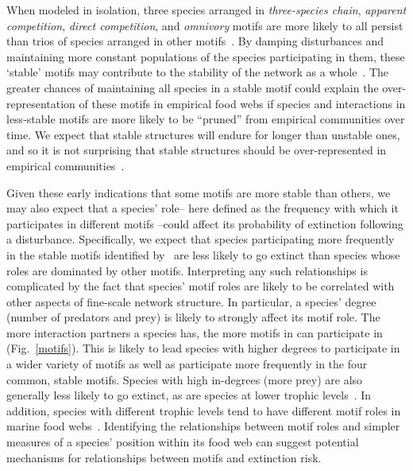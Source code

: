 \documentclass[12pt]{article}
\begin{document}
\begin{spacing}{2.0}
	When modeled in isolation, three species arranged in \emph{three-species chain}, \emph{apparent competition}, \emph{direct competition}, and \emph{omnivory} motifs are more likely to all persist than trios of species arranged in other motifs~\citep{Borrelli2015a}.
	By damping disturbances and maintaining more constant populations of the species participating in them, these `stable' motifs may contribute to the stability of the network as a whole~\citep{Borrelli2015a}. 
    The greater chances of maintaining all species in a stable motif could explain the over-representation of these motifs in empirical food webs if species and interactions in less-stable motifs are more likely to be ``pruned'' from empirical communities over time. We expect that stable structures will endure for longer than unstable ones, and so it is not surprising that stable structures should be over-represented in empirical communities~\citep{Borrelli2015}.


	Given these early indications that some motifs are more stable than others, we may also expect that a species' role-- here defined as the frequency with which it participates in different motifs --could affect its probability of extinction following a disturbance.
	Specifically, we expect that species participating more frequently in the stable motifs identified by~\citet{Borrelli2015a} are less likely to go extinct than species whose roles are dominated by other motifs.
	Interpreting any such relationships is complicated by the fact that species' motif roles are likely to be correlated with other aspects of fine-scale network structure. 
    In particular, a species' degree (number of predators and prey) is likely to strongly affect its motif role.
    The more interaction partners a species has, the more motifs in can participate in (Fig.~\ref{motifs}).
    This is likely to lead species with higher degrees to participate in a wider variety of motifs as well as participate more frequently in the four common, stable motifs.
    Species with high in-degrees (more prey) are also generally less likely to go extinct, as are species at lower trophic levels~\citep{Cirtwill2018FoodWebs}.
    In addition, species with different trophic levels tend to have different motif roles in marine food webs~\citep{Cirtwill2018EcolLett}.
    Identifying the relationships between motif roles and simpler measures of a species' position within its food web can suggest potential mechanisms for relationships between motifs and extinction risk.


\end{spacing}
\end{document}
